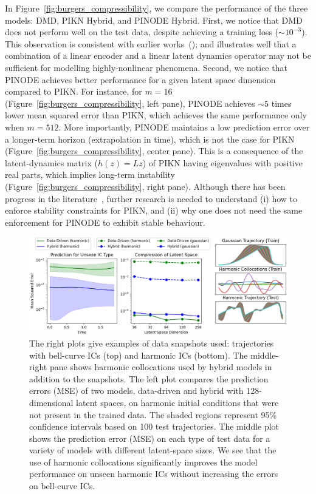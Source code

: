 In Figure~\ref{fig:burgers_compressibility}, we compare the performance of the three models: DMD, PIKN Hybrid, and PINODE Hybrid. First, we notice that DMD does not perform well on the test data, despite achieving a training loss ($\sim 10^{-3}$). This observation is consistent with earlier works~(\citep{kalur2021robust,kutz2016dynamic}); and illustrates well that a combination of a linear encoder and a linear latent dynamics operator may not be sufficient for modelling highly-nonlinear phenomena. Second, we notice that PINODE achieves better performance for a given latent space dimension compared to PIKN. For instance, for $m = 16$ (Figure~\ref{fig:burgers_compressibility}, left pane), PINODE achieves $\sim 5$ times lower mean squared error than PIKN, which achieves the same performance only when $m = 512$. More importantly, PINODE maintains a low prediction error over a longer-term horizon (extrapolation in time), which is not the case for PIKN (Figure~\ref{fig:burgers_compressibility}, center pane). This is a consequence of the latent-dynamics matrix ($h(z) = Lz$) of PIKN having eigenvalues with positive real parts, which implies long-term instability (Figure~\ref{fig:burgers_compressibility}, right pane). Although there has been progress in the literature~\citep{kojimalearning}, further research is needed to understand (i) how to enforce stability constraints for PIKN, and (ii) why one does not need the same enforcement for PINODE to exhibit stable behaviour. 

	\begin{figure}[t]
        \centering
        \includegraphics[width=\textwidth]{figures/burgers_compression.png}
        \caption{The right plots give examples of data snapshots used: trajectories with bell-curve ICs (top) and harmonic ICs (bottom). The middle-right pane shows harmonic collocations used by hybrid models in addition to the snapshots. The left plot compares the prediction errors (MSE) of two models, data-driven and hybrid with 128-dimensional latent spaces, on harmonic initial conditions that were not present in the trained data. The shaded regions represent 95\% confidence intervals based on 100 test trajectories. The middle plot shows the prediction error (MSE) on each type of test data for a variety of models with different latent-space sizes. We see that the use of harmonic collocations significantly improves the model performance on unseen harmonic ICs without increasing the errors on bell-curve ICs.}
        \label{fig:pikn_burgers_compression}
    \end{figure}
    
